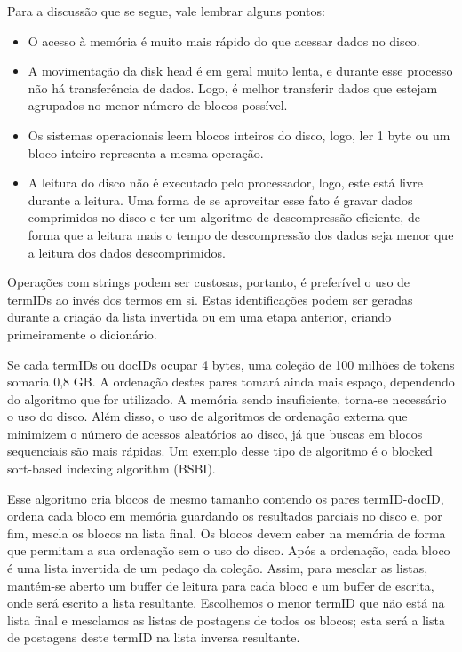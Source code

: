 Para a discussão que se segue, vale lembrar alguns pontos:
\begin{itemize}
\item O acesso à memória é muito mais rápido do que acessar dados no disco.
\item A movimentação da disk head é em geral muito lenta, e durante esse processo não há transferência de dados. Logo, é melhor transferir dados que estejam agrupados no menor número de blocos possível.
\item Os sistemas operacionais leem blocos inteiros do disco, logo, ler 1 byte ou um bloco inteiro representa a mesma operação.
\item A leitura do disco não é executado pelo processador, logo, este está livre durante a leitura. Uma forma de se aproveitar esse fato é gravar dados comprimidos no disco e ter um algoritmo de descompressão eficiente, de forma que a leitura mais o tempo de descompressão dos dados seja menor que a leitura dos dados descomprimidos.
\end{itemize}


Operações com strings podem ser custosas, portanto, é preferível o uso de termIDs ao invés dos termos em si. Estas identificações podem ser geradas durante a criação da lista invertida ou em uma etapa anterior, criando primeiramente o dicionário.

Se cada termIDs ou docIDs ocupar 4 bytes, uma coleção de 100 milhões de tokens somaria 0,8 GB. A ordenação destes pares tomará ainda mais espaço, dependendo do algoritmo que for utilizado. A memória sendo insuficiente, torna-se necessário o uso do disco. Além disso, o uso de algoritmos de ordenação externa que minimizem o número de acessos aleatórios ao disco, já que buscas em blocos sequenciais são mais rápidas. Um exemplo desse tipo de algoritmo é o blocked sort-based indexing algorithm (BSBI). 

Esse algoritmo cria blocos de mesmo tamanho contendo os pares termID-docID, ordena cada bloco em memória guardando os resultados parciais no disco e, por fim, mescla os blocos na lista final. Os blocos devem caber na memória de forma que permitam a sua ordenação sem o uso do disco. Após a ordenação, cada bloco é uma lista invertida de um pedaço da coleção. Assim, para mesclar as listas, mantém-se aberto um buffer de leitura para cada bloco e um buffer de escrita, onde será escrito a lista resultante. Escolhemos o menor termID que não está na lista final e mesclamos as listas de postagens de todos os blocos; esta será a lista de postagens deste termID na lista inversa resultante. 

